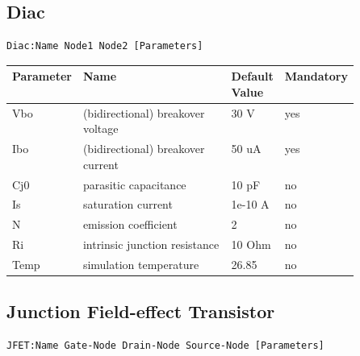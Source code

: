 \subsection{Diac}

\begin{verbatim}
Diac:Name Node1 Node2 [Parameters]
\end{verbatim}


\begin{tabular}{|l|p{0.5\linewidth}|l|l|}
\hline
Parameter & Name & Default Value & Mandatory \\
\hline
Vbo & (bidirectional) breakover voltage & 30 V & yes \\
Ibo & (bidirectional) breakover current & 50 uA & yes \\
Cj0 & parasitic capacitance & 10 pF & no \\
Is & saturation current & 1e-10 A & no \\
N & emission coefficient & 2 & no \\
Ri & intrinsic junction resistance & 10 Ohm & no \\
Temp & simulation temperature & 26.85 & no \\
\hline
\end{tabular}


\subsection{Junction Field-effect Transistor}

\begin{verbatim}
JFET:Name Gate-Node Drain-Node Source-Node [Parameters]
\end{verbatim}


